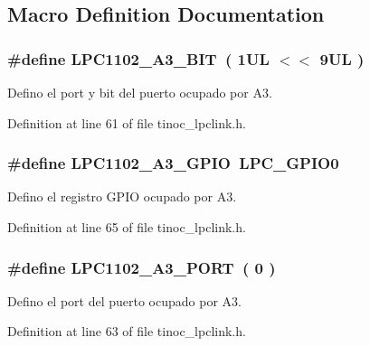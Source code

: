 \subsection{Macro Definition Documentation}
\subsubsection[{\texorpdfstring{L\+P\+C1102\+\_\+\+A3\+\_\+\+B\+IT}{LPC1102_A3_BIT}}]{\setlength{\rightskip}{0pt plus 5cm}\#define L\+P\+C1102\+\_\+\+A3\+\_\+\+B\+IT~( 1\+U\+L $<$$<$ 9\+U\+L )}\hypertarget{group___p_i_n_a3_ga42cf8ceb71f191c96859d8cbc3850b45}{}\label{group___p_i_n_a3_ga42cf8ceb71f191c96859d8cbc3850b45}


Defino el port y bit del puerto ocupado por A3. 



Definition at line 61 of file tinoc\+\_\+lpclink.\+h.

\subsubsection[{\texorpdfstring{L\+P\+C1102\+\_\+\+A3\+\_\+\+G\+P\+IO}{LPC1102_A3_GPIO}}]{\setlength{\rightskip}{0pt plus 5cm}\#define L\+P\+C1102\+\_\+\+A3\+\_\+\+G\+P\+IO~L\+P\+C\+\_\+\+G\+P\+I\+O0}\hypertarget{group___p_i_n_a3_ga10234a1267cbec06f769ec87765df961}{}\label{group___p_i_n_a3_ga10234a1267cbec06f769ec87765df961}


Defino el registro G\+P\+IO ocupado por A3. 



Definition at line 65 of file tinoc\+\_\+lpclink.\+h.

\subsubsection[{\texorpdfstring{L\+P\+C1102\+\_\+\+A3\+\_\+\+P\+O\+RT}{LPC1102_A3_PORT}}]{\setlength{\rightskip}{0pt plus 5cm}\#define L\+P\+C1102\+\_\+\+A3\+\_\+\+P\+O\+RT~( 0 )}\hypertarget{group___p_i_n_a3_ga5078bdf03502964ece28e1594df9a997}{}\label{group___p_i_n_a3_ga5078bdf03502964ece28e1594df9a997}


Defino el port del puerto ocupado por A3. 



Definition at line 63 of file tinoc\+\_\+lpclink.\+h.

